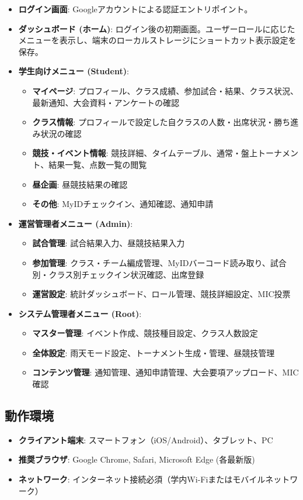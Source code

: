 \documentclass[paper=a4, fontsize=11pt]{jlreq}
\begin{document}
\begin{itemize}
    \item \textbf{ログイン画面}: Googleアカウントによる認証エントリポイント。
    \item \textbf{ダッシュボード (ホーム)}: ログイン後の初期画面。ユーザーロールに応じたメニューを表示し、端末のローカルストレージにショートカット表示設定を保存。
    \item \textbf{学生向けメニュー (Student)}:
    \begin{itemize}
        \item \textbf{マイページ}: プロフィール、クラス成績、参加試合・結果、クラス状況、最新通知、大会資料・アンケートの確認
        \item \textbf{クラス情報}: プロフィールで設定した自クラスの人数・出席状況・勝ち進み状況の確認
        \item \textbf{競技・イベント情報}: 競技詳細、タイムテーブル、通常・盤上トーナメント、結果一覧、点数一覧の閲覧
        \item \textbf{昼企画}: 昼競技結果の確認
        \item \textbf{その他}: MyIDチェックイン、通知確認、通知申請
    \end{itemize}
    \item \textbf{運営管理者メニュー (Admin)}:
    \begin{itemize}
        \item \textbf{試合管理}: 試合結果入力、昼競技結果入力
        \item \textbf{参加管理}: クラス・チーム編成管理、MyIDバーコード読み取り、試合別・クラス別チェックイン状況確認、出席登録
        \item \textbf{運営設定}: 統計ダッシュボード、ロール管理、競技詳細設定、MIC投票
    \end{itemize}
    \item \textbf{システム管理者メニュー (Root)}:
    \begin{itemize}
        \item \textbf{マスター管理}: イベント作成、競技種目設定、クラス人数設定
        \item \textbf{全体設定}: 雨天モード設定、トーナメント生成・管理、昼競技管理
        \item \textbf{コンテンツ管理}: 通知管理、通知申請管理、大会要項アップロード、MIC確認
    \end{itemize}
\end{itemize}

\subsection{動作環境}
\begin{itemize}
    \item \textbf{クライアント端末}: スマートフォン（iOS/Android）、タブレット、PC
    \item \textbf{推奨ブラウザ}: Google Chrome, Safari, Microsoft Edge (各最新版)
    \item \textbf{ネットワーク}: インターネット接続必須（学内Wi-Fiまたはモバイルネットワーク）
\end{itemize}
\end{document}
